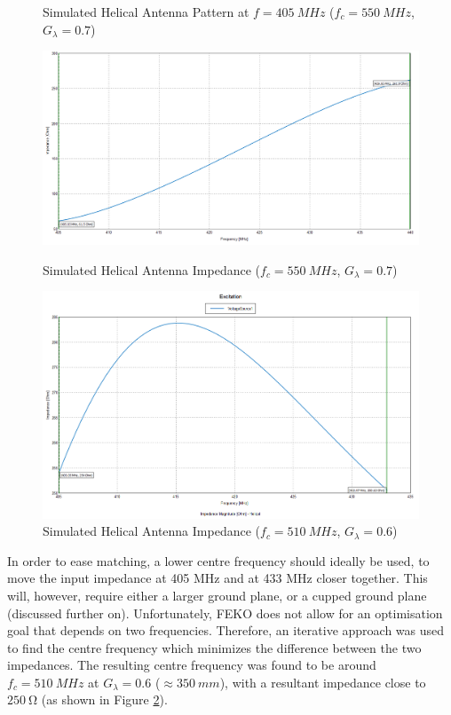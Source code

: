 \begin{figure}[!htb]
\begin{minipage}{.48\textwidth}
    \caption{Simulated Helical Antenna Pattern at $f = \SI{405}{MHz}$ ($f_c = \SI{550}{MHz}$, $G_\lambda = 0.7$)}
    \label{fig:helix3_pattern_405MHz}
  \end{minipage}
\end{figure}

\begin{figure}[!htb]
  \begin{minipage}{.49\textwidth}
    \centering
    \includegraphics[width=0.95\linewidth]{helix3_impedance}
    \caption{Simulated Helical Antenna Impedance ($f_c = \SI{550}{MHz}$, $G_\lambda = 0.7$)}
    \label{fig:helix3_impedance}
  \end{minipage}
  \begin{minipage}{.49\textwidth}
    \centering
    \includegraphics[width=0.95\linewidth]{helix4_impedance}
    \caption{Simulated Helical Antenna Impedance ($f_c = \SI{510}{MHz}$, $G_\lambda = 0.6$)}
    \label{fig:helix4_impedance}
  \end{minipage}
\end{figure}

In order to ease matching, a lower centre frequency should ideally be used, to move the input impedance at 405 MHz and at 433 MHz closer together. This will, however, require either a larger ground plane, or a cupped ground plane (discussed further on). Unfortunately, FEKO does not allow for an optimisation goal that depends on two frequencies. Therefore, an iterative approach was used to find the centre frequency which minimizes the difference between the two impedances. The resulting centre frequency was found to be around $f_c = \SI{510}{MHz}$ at $G_\lambda = 0.6$ ($\approx \SI{350}{mm}$), with a resultant impedance close to $\SI{250}{\ohm}$ (as shown in Figure \ref{fig:helix4_impedance}).

